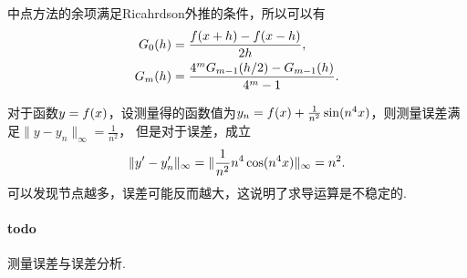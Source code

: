   \begin{pos}[外推]
    中点方法的余项满足Ricahrdson外推的条件，所以可以有
    \[  \begin{split}
      G_0(h) &= \frac{\mathnormal{f}(x+h) - \mathnormal{f}(x-h)}{2h}, \\
      G_m(h) &= \frac{4^mG_{m-1}(h/2) - G_{m-1}(h)}{4^m-1}.
    \end{split}\]
  \end{pos}

  \begin{exa}[测量误差的影响]
    对于函数$y=\mathnormal{f}(x)$，设测量得的函数值为$y_n=\mathnormal{f}(x)+\frac{1}{n^2}
    \sin(n^4x)$，则测量误差满足$\|y-y_n\|_{\infty}=\frac{1}{n^2}$，
    但是对于误差，成立
    \[
      \|y^\prime-y^\prime_n\|_{\infty}
      = \|\frac{1}{n^2}n^4\cos(n^4x)\|_{\infty} = n^2.
    \]
    可以发现节点越多，误差可能反而越大，这说明了求导运算是不稳定的.
  \end{exa}

  \paragraph{todo}
    测量误差与误差分析.
